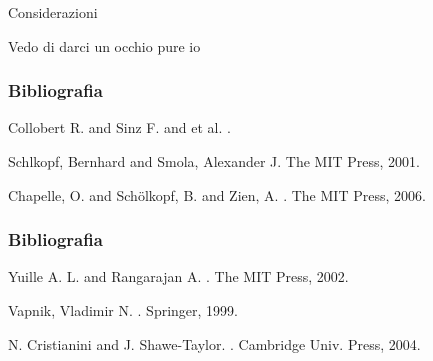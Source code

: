 \documentclass[slidestop,mathserif,red]{beamer}
\begin{document}
\begin{frame}{Considerazioni}
\begin{block}{}
Vedo di darci un occhio pure io
\end{block}
\end{frame}

\begin{frame}
	\frametitle{Bibliografia}
	
		\begin{thebibliography}{}
				\footnotesize
				
			 	Collobert R. and Sinz F. and et al.  
				.
				
				Schlkopf, Bernhard   and Smola, Alexander  J. 
				\newblock The MIT Press, 2001.
				
				Chapelle, O.  and Sch\"{o}lkopf, B.  and Zien, A. 
				.
				\newblock The MIT Press, 2006.


\end{thebibliography}
\end{frame}

\begin{frame}
	\frametitle{Bibliografia}
	
		\begin{thebibliography}{}
				\footnotesize
				\bibitem<1->[Solomaa, 1973]{Solomaa1973}
				Yuille A. L. and Rangarajan A. 
				.
				\newblock The MIT Press, 2002.
				
				
				Vapnik, Vladimir  N.  
				.
				\newblock Springer, 1999.
				
				
					
			   N. Cristianini and J. Shawe-Taylor.
				.
				\newblock Cambridge Univ. Press, 2004.
				
				
				
				
				
			
				

\end{thebibliography}
\end{frame}
\end{document}
